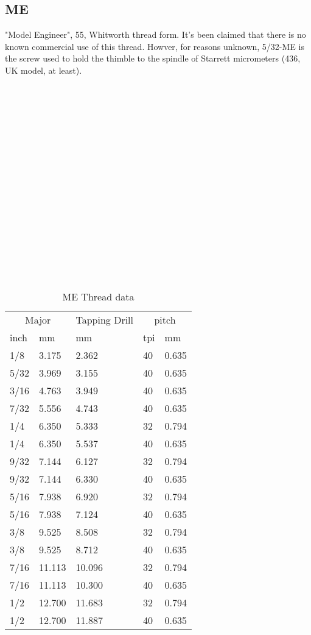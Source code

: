 \subsection{ME}
"Model Engineer", 55\degree, Whitworth thread form.  It's been claimed that there is no known commercial use of this thread. Howver, for reasons unknown, 5/32-ME is the screw used to hold the thimble to the spindle of Starrett micrometers (436, UK model, at least).
\\ \\ \\ \\ \\ \\ \\ \\ \\ \\ \\ \\ \\ \\ \\ \\ \\ \\
\begin{table}[h!]
    \footnotesize
\begin{longtable}{ll|l|ll}
    \multicolumn{2}{c}{Major}
    &Tapping Drill
    &\multicolumn{2}{c}{pitch}
    \\
    inch
    &mm

    &mm

    &tpi
    &mm
    \\
\hline
1/8  & 3.175 & 2.362  &40 &0.635\\
5/32 & 3.969 & 3.155  &40 &0.635\\
3/16 & 4.763 & 3.949  &40 &0.635\\
7/32 & 5.556 & 4.743  &40 &0.635\\
1/4  & 6.350 & 5.333  &32 &0.794\\
1/4  & 6.350 & 5.537  &40 &0.635\\
9/32 & 7.144 & 6.127  &32 &0.794\\
9/32 & 7.144 & 6.330  &40 &0.635\\
5/16 & 7.938 & 6.920  &32 &0.794\\
5/16 & 7.938 & 7.124  &40 &0.635\\
3/8  & 9.525 & 8.508  &32 &0.794\\
3/8  & 9.525 & 8.712  &40 &0.635\\
7/16 &11.113 &10.096  &32 &0.794\\
7/16 &11.113 &10.300  &40 &0.635\\
1/2  &12.700 &11.683  &32 &0.794\\
1/2  &12.700 &11.887  &40 &0.635\\
\end{longtable}
\caption{ME Thread data}
\end{table}
\clearpage
